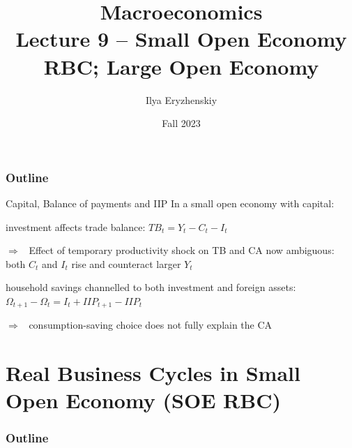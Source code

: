 \documentclass{beamer}
\title[PSME]{Macroeconomics\\ Lecture 9 -- Small Open Economy RBC; Large Open Economy}
\author[I. Eryzhenskiy]{Ilya Eryzhenskiy}
\institute[Paris-1]{PSME Panth\'{e}on-Sorbonne Master in Economics}
\date[PSME macro]{Fall 2023}
\newenvironment{mytemize}
{\vfill\itemize[nolistsep,itemsep=\fill,label=\color{blue}{$\triangleright$}]}
  {\enditemize}
\newenvironment{mynumerate}
{\vfill\enumerate[nolistsep,itemsep=\fill,label=\arabic*.]}
  {\endenumerate}
\newcommand{\rarr}{$\Rightarrow$\ }
\begin{document}
\begin{frame}
\maketitle
\end{frame}
\begin{frame}
\frametitle{Outline}
\tableofcontents
\end{frame}

\begin{frame}{Capital, Balance of payments and IIP}
  In a small open economy with capital:  
  \begin{mynumerate}
  \item investment affects trade balance: $TB_t = Y_t - C_t - I_t$
	\begin{mytemize}
	  \item[\rarr] Effect of temporary productivity shock on TB and CA now ambiguous: both $C_t$ and $I_t$ rise and counteract larger $Y_t$
	\end{mytemize}
  \item household savings channelled to both investment and foreign assets: $\Omega_{t+1} - \Omega_t = I_t + IIP_{t+1} - IIP_t$
	\begin{mytemize}
	  \item[\rarr] consumption-saving choice does not fully explain the CA
	\end{mytemize}
  \end{mynumerate}
\end{frame}


\section{Real Business Cycles in Small Open Economy (SOE RBC)}

\begin{frame}
\frametitle{Outline}
\tableofcontents[currentsection]
\end{frame}
\end{document}
